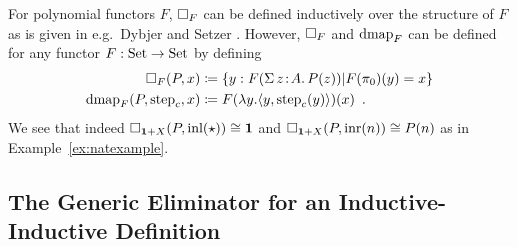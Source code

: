 \documentclass[orivec,envcountsame, ,envcountsect]{llncs}
\begin{document}
For polynomial functors $F$, $\Box_F$ can be defined inductively over
the structure of $F$ as is given in e.g.\ Dybjer and Setzer
\cite{dybjersetzer2003inalg}. However, $\Box_F$ and $\text{dmap}_F$ can be
defined for any functor $F : \text{Set} \to \text{Set}$ by defining
\begin{align*}
  \Box_F(P, x) &\coloneqq \{ y : F(\Sigma\,z\!:\!A .\,P(z)) | F(\pi_0)(y) = x\} \\
  \text{dmap}_F(P, \text{step}_{c}, x) &\coloneqq F(\lambda y . \langle y, \text{step}_{c}(y)\rangle)(x) \enspace .
\end{align*}
We see that indeed $\Box_{\mathbf{1} + X}(P, \text{inl}(\star)) \cong \mathbf{1}$ and
$\Box_{\mathbf{1} + X}(P, \text{inr}(n)) \cong P(n)$ as in Example~\ref{ex:natexample}.


\subsection{The Generic Eliminator for an Inductive-Inductive Definition}
\label{sec:elim-indind}
\end{document}
